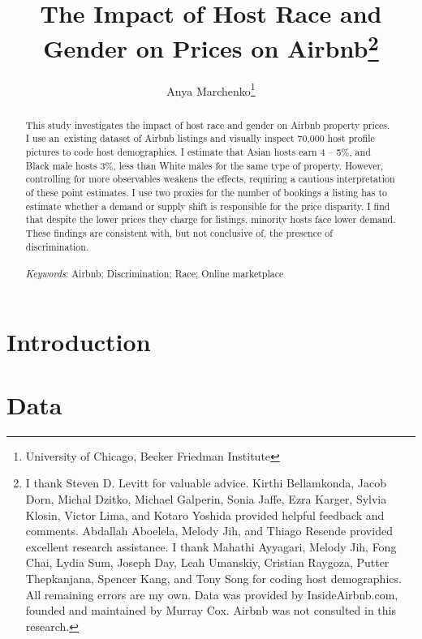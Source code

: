 \documentclass[11pt, oneside]{article}
\begin{document}
		
	\title{The Impact of Host Race and Gender on Prices on Airbnb\footnote
		{I thank Steven D. Levitt for valuable advice. Kirthi Bellamkonda, Jacob Dorn, Michal Dzitko, Michael Galperin, Sonia Jaffe, Ezra Karger, Sylvia Klosin, Victor Lima, and Kotaro Yoshida provided helpful feedback and comments. Abdallah Aboelela, Melody Jih, and Thiago Resende provided excellent research assistance. I thank Mahathi Ayyagari, Melody Jih, Fong Chai, Lydia Sum, Joseph Day, Leah Umanskiy, Cristian Raygoza, Putter Thepkanjana, Spencer Kang, and Tony Song for coding host demographics. All remaining errors are my own. Data was provided by InsideAirbnb.com, founded and maintained by Murray Cox. Airbnb was not consulted in this research.}}
	\author{Anya Marchenko\footnote{University of Chicago, Becker Friedman Institute}}
	\maketitle
	
	\begin{abstract}
		This study investigates the impact of host race and gender on Airbnb property prices. I use an existing dataset of Airbnb listings and visually inspect 70,000 host profile pictures to code host demographics. I estimate that Asian hosts earn 4 -- 5\%, and Black male hosts 3\%, less than White males for the same type of property. However, controlling for more observables weakens the effects, requiring a cautious interpretation of these point estimates. I use two proxies for the number of bookings a listing has to estimate whether a demand or supply shift is responsible for the price disparity. I find that despite the lower prices they charge for listings, minority hosts face lower demand. These findings are consistent with, but not conclusive of, the presence of discrimination. 
		\\\\
		\textit{Keywords}: Airbnb; Discrimination; Race; Online marketplace
		
	\end{abstract}
	
	\newpage
	
	\singlespacing
	\section{Introduction}
	
	\label{intro}

\newpage
	\section{Data}
	
	\label{data}
	
\end{document}
